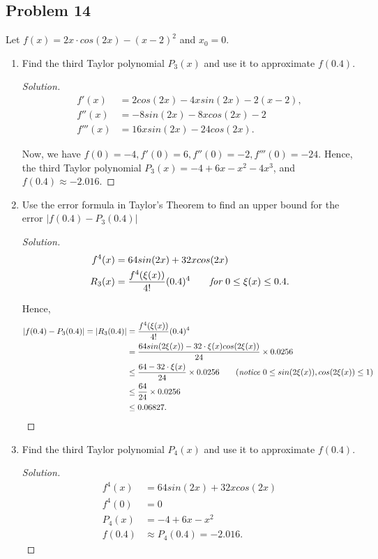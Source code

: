 \documentclass{article}
\begin{document}
\subsection*{Problem 14}
Let $f(x) = 2x\cdot cos(2x) - (x-2)^2$ and $x_0 = 0$.
\begin{enumerate}[label=(\alph*)]
    \item Find the third Taylor polynomial $P_3(x)$ and use it to approximate $f(0.4)$.
    \begin{proof}[Solution]
        \begin{align*}
            f'(x) & = 2cos(2x) - 4xsin(2x) - 2(x-2), \\
            f''(x) & = -8sin(2x) - 8xcos(2x) - 2 \\
            f'''(x) & = 16xsin(2x) - 24cos(2x).
        \end{align*}

        Now, we have $f(0) = -4, f'(0) = 6, f''(0) = -2, f'''(0) = -24$. Hence, the third Taylor 
        polynomial $P_3(x) = -4 + 6x -x^2 -4x^3$, and $f(0.4) \approx -2.016$.
    \end{proof}

    \item Use the error formula in Taylor's Theorem to find an upper bound for the error 
    $|f(0.4) - P_3(0.4)|$

    \begin{proof}[Solution]
        \begin{align*}
            f^4(x) & = 64sin(2x) + 32xcos(2x) \\
            R_3(x) & = \frac{f^4(\xi(x))}{4!}(0.4)^4 \qquad \emph{for } 0 \le \xi(x) \le 0.4.
        \end{align*}

        Hence, \begin{align*}
            |f(0.4) - P_3(0.4)| = |R_3(0.4)| & = \frac{f^4(\xi(x))}{4!}(0.4)^4 \\
            & = \frac{64sin(2\xi(x))-32\cdot \xi(x)cos(2\xi(x))}{24}\times 0.0256 \\
            & \le \frac{64-32\cdot \xi(x)}{24}\times 0.0256 \qquad (\emph{notice } 0 \le sin(2\xi(x)),
            cos(2\xi(x))\le 1)\\
            & \le \frac{64}{24}\times 0.0256 \\
            & \le 0.06827.
        \end{align*}
    \end{proof}

    \item Find the third Taylor polynomial $P_4(x)$ and use it to approximate $f(0.4)$.
    \begin{proof}[Solution]
        \begin{align*}
            f^4(x) & = 64sin(2x) + 32xcos(2x) \\
            f^4(0) & = 0 \\
            P_4(x) & = -4 + 6x -x^2 \\
            f(0.4) & \approx P_4(0.4) = -2.016.
        \end{align*}
    \end{proof}


\end{enumerate}
\end{document}
